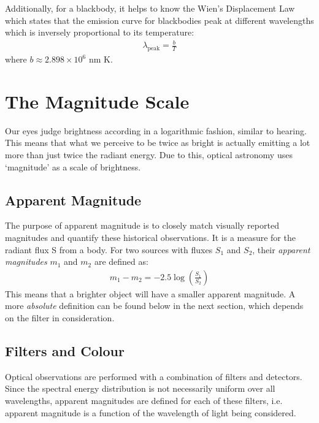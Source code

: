 \documentclass[a4paper,11pt]{report}
\newcommand{\ti}[1]{\textit{#1}}
\begin{document}
\begin{figure}[h]
  \centering
  
\end{figure}

Additionally, for a blackbody, it helps to know the Wien's Displacement Law which states that the emission curve for blackbodies peak at different wavelengths which is inversely proportional to its temperature:
\begin{align}
  \lambda_\text{peak} = \frac{b}{T} \label{eq:wien law}
\end{align}
where $b \approx 2.898 \times 10^6$ nm K.

\section{The Magnitude Scale}
Our eyes judge brightness according in a logarithmic fashion, similar to hearing. This means that what we perceive to be twice as bright is actually emitting a lot more than just twice the radiant energy. Due to this, optical astronomy uses `magnitude' as a scale of brightness.

\subsection{Apparent Magnitude}
The purpose of apparent magnitude is to closely match visually reported magnitudes and quantify these historical observations. It is a measure for the radiant flux S from a body. For two sources with fluxes $S_1$ and $S_2$, their \ti{apparent magnitudes} $m_1$ and $m_2$ are defined as:
\begin{align*}
  m_1 - m_2 = - 2.5 \log(\frac{S_1}{S_2})
\end{align*}
This means that a brighter object will have a smaller apparent magnitude.  A more \ti{absolute} definition can be found below in the next section, which depends on the filter in consideration.

\subsection{Filters and Colour}
Optical observations are performed with a combination of filters and detectors. Since the spectral energy distribution is not necessarily uniform over all wavelengths, apparent magnitudes are defined for each of these filters, i.e. apparent magnitude is a function of the wavelength of light being considered.
\end{document}
